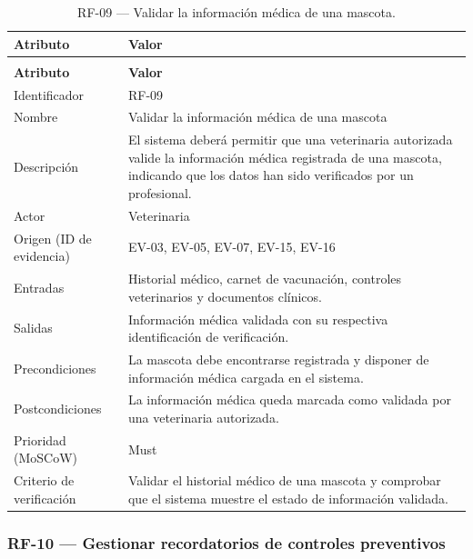 \documentclass[journal,onecolumn]{IEEEtran}
\makeatletter
\newenvironment{atributos}[2]{%
	\small
	\begin{longtable}{@{}>{\raggedright\arraybackslash}p{4.2cm} >{\raggedright\arraybackslash}p{11.2cm}@{}}
		\caption{#2}\label{tab:#1}\\
		\toprule
		\textbf{Atributo} & \textbf{Valor} \\
		\midrule
		\endfirsthead
		\multicolumn{2}{@{}l}{\small\itshape (continuación)}\\
		\toprule
		\textbf{Atributo} & \textbf{Valor} \\
		\midrule
		\endhead
		\bottomrule
		\endlastfoot
	}{%
	\end{longtable}
	\normalsize
}
\makeatother
\begin{document}
	\begin{atributos}{RF-09}{RF-09 --- Validar la información médica de una mascota.}
		Identificador & RF-09 \\
		Nombre & Validar la información médica de una mascota \\
		Descripción & El sistema deberá permitir que una veterinaria autorizada valide la información médica registrada de una mascota, indicando que los datos han sido verificados por un profesional. \\
		Actor & Veterinaria \\
		Origen (ID de evidencia) & EV-03, EV-05, EV-07, EV-15, EV-16 \\
		Entradas & Historial médico, carnet de vacunación, controles veterinarios y documentos clínicos. \\
		Salidas & Información médica validada con su respectiva identificación de verificación. \\
		Precondiciones & La mascota debe encontrarse registrada y disponer de información médica cargada en el sistema. \\
		Postcondiciones & La información médica queda marcada como validada por una veterinaria autorizada. \\
		Prioridad (MoSCoW) & Must \\
		Criterio de verificación & Validar el historial médico de una mascota y comprobar que el sistema muestre el estado de información validada. \\
	\end{atributos}
	
	\subsubsection{RF-10 --- Gestionar recordatorios de controles preventivos}
	
\end{document}
